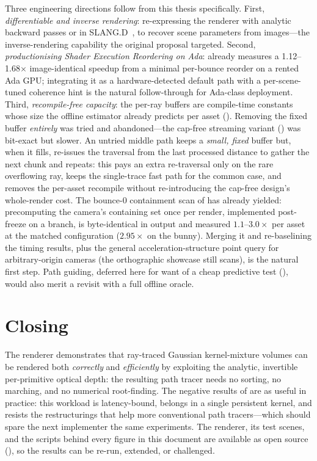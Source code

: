 Three engineering directions follow from this thesis specifically. First, \emph{differentiable and
inverse rendering}: re-expressing the renderer with analytic backward passes or in
SLANG.D~\cite{SLANG.D}, to recover scene parameters from images---the inverse-rendering capability the
original proposal targeted. Second, \emph{productionising Shader Execution Reordering on Ada}:
 already measures a \num{1.12}--\num{1.68}$\times$ image-identical speedup from a minimal
per-bounce reorder on a rented Ada GPU; integrating it as a hardware-detected default path with a
per-scene-tuned coherence hint is the natural follow-through for Ada-class deployment. Third, \emph{recompile-free capacity}: the per-ray buffers are compile-time constants whose size the
offline estimator already predicts per asset (). Removing the fixed buffer
\emph{entirely} was tried and abandoned---the cap-free streaming variant () was bit-exact but slower. An untried middle path keeps a \emph{small, fixed} buffer but, when it fills,
re-issues the traversal from the last processed distance to gather the next chunk and repeats: this pays
an extra re-traversal only on the rare overflowing ray, keeps the single-trace fast path for the common
case, and removes the per-asset recompile without re-introducing the cap-free design's
whole-render cost. The bounce-\num{0} containment scan of  has already yielded:
precomputing the camera's containing set once per render, implemented post-freeze on a
branch, is byte-identical in output and measured $1.1$--$3.0\times$ per asset at the
matched configuration ($2.95\times$ on the bunny). Merging it and re-baselining the
timing results, plus the general acceleration-structure point query for arbitrary-origin
cameras (the orthographic showcase still scans), is the natural first step. Path guiding, deferred here for want of a cheap
predictive test (), would also merit a revisit with a full offline oracle.

\section{Closing}
\label{sec:closing}

The renderer demonstrates that ray-traced Gaussian kernel-mixture volumes can be rendered
both \emph{correctly} and \emph{efficiently} by exploiting the analytic, invertible
per-primitive optical depth: the resulting path tracer needs no sorting, no marching, and
no numerical root-finding. The negative results of  are as useful in
practice: this workload is latency-bound, belongs in a single persistent kernel, and
resists the restructurings that help more conventional path tracers---which should spare
the next implementer the same experiments. The renderer, its test scenes, and the scripts behind
every figure in this document are available as open source (), so the
results can be re-run, extended, or challenged.
